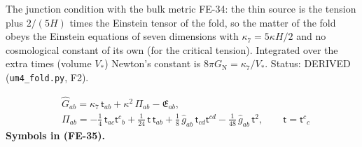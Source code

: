 \documentclass[
  10pt,
]{article}
\begin{document}
The junction condition with the bulk metric FE-34: the thin source is
the tension plus \(2/(5H)\) times the Einstein tensor of the fold, so
the matter of the fold obeys the Einstein equations of seven dimensions
with \(\kappa_7 = 5\kappa H/2\) and no cosmological constant of its own
(for the critical tension). Integrated over the extra times (volume
\(V_*\)) Newton's constant is \(8\pi G_{\mathrm{N}} = \kappa_7/V_*\).
Status: DERIVED (\texttt{um4\_fold.py}, F2).

\[
\begin{aligned}
&\hat G_{ab} = \kappa_7\,\mathsf{t}_{ab} + \kappa^2\,\Pi_{ab} - \mathfrak{E}_{ab},\\
&\Pi_{ab} = -\frac14\,\mathsf{t}_{ac}\mathsf{t}^c{}_b + \frac{1}{24}\,\mathsf{t}\,\mathsf{t}_{ab} + \frac18\,\hat g_{ab}\,\mathsf{t}_{cd}\mathsf{t}^{cd}
 - \frac{1}{48}\,\hat g_{ab}\,\mathsf{t}^2,\qquad \mathsf{t} = \mathsf{t}^c{}_c
\end{aligned} \tag{FE-35}
\] \textbf{Symbols in (FE-35).}
\end{document}

